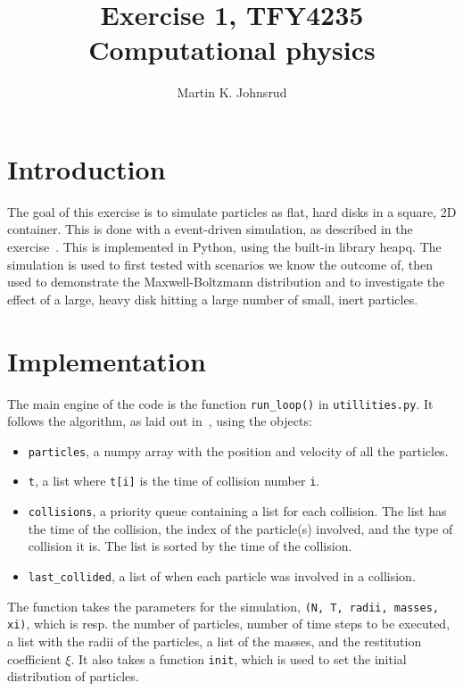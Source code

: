 \documentclass{article}
\title{Exercise 1, TFY4235 Computational physics}
\author{Martin K. Johnsrud}
\date{}
\begin{document}
    \maketitle
    \section*{Introduction}
        The goal of this exercise is to simulate particles as flat, hard disks in a square, 2D container. This is done with a event-driven simulation, as described in the exercise~\cite{exercise}. This is implemented in Python, using the built-in library heapq. The simulation is used to first tested with scenarios we know the outcome of, then used to demonstrate the Maxwell-Boltzmann distribution and to investigate the effect of a large, heavy disk hitting a large number of small, inert particles.
    
    \section*{Implementation}
        The main engine of the code is the function \verb|run_loop()| in \verb|utillities.py|. It follows the algorithm, as laid out in~\cite{exercise}, using the objects:
        \begin{itemize}
            \item \verb|particles|, a numpy array with the position and velocity of all the particles.
            \item \verb|t|, a list where \verb|t[i]| is the time of collision number \verb|i|.
            \item \verb|collisions|, a priority queue containing a list for each collision. The list has the time of the collision, the index of the particle(s) involved, and the type of collision it is. The list is sorted by the time of the collision.
            \item \verb|last_collided|, a list of when each particle was involved in a collision.
        \end{itemize}
        The function takes the parameters for the simulation, \verb|(N, T, radii, masses, xi)|, which is resp. the number of particles, number of time steps to be executed, a list with the radii of the particles, a list of the masses, and the restitution coefficient $\xi$. It also takes a function \verb|init|, which is used to set the initial distribution of particles. 
        
\end{document}
